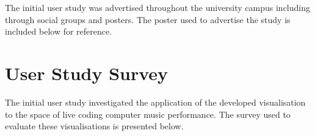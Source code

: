 The initial user study was advertised throughout the university campus including through social groups and posters. The poster used to advertise the study is included below for reference.

\begin{center}
\end{center}

\chapter{User Study Survey}
\label{appendix:user-study-survey}

The initial user study investigated the application of the developed visualisation to the space of live coding computer music performance. The survey used to evaluate these visualisations is presented below.


